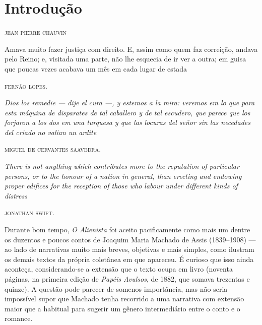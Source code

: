 \chapter[Introdução, \emph{por Jean Pierre Chauvin}]{Introdução}

\begin{flushright}
\textsc{jean pierre chauvin}
\end{flushright}

\epigraph{Amava muito fazer justiça com direito. E, assim como quem faz
correição, andava pelo Reino; e, visitada uma parte, não lhe esquecia de
ir ver a outra; em guisa que poucas vezes acabava um mês em cada lugar
de estada}{\textsc{fernão lopes}.\footnotemark}

\epigraph{\emph{Dios los remedie --- dije el cura ---, y estemos a la mira:
veremos em lo que para esta máquina de disparates de tal caballero y de
tal escudero, que parece que los forjaron a los dos em una turquesa y
que las locuras del señor sin las necedades del criado no valian un
ardite}}{\textsc{miguel de cervantes saavedra}.\footnotemark}

\epigraph{\emph{There is not anything which contributes more to the reputation
of particular persons, or to the honour of a nation in general, than
erecting and endowing proper edifices for the reception of those who
labour under different kinds of distress}}{\textsc{jonathan swift}.\footnotemark}

Durante bom tempo, \emph{O Alienista} foi aceito pacificamente como mais
um dentre os duzentos e poucos contos de Joaquim Maria Machado de Assis
(1839--1908) --- ao lado de narrativas muito mais breves, objetivas e mais
simples, como ilustram os demais textos da própria coletânea em que
apareceu. É curioso que isso ainda aconteça, considerando-se a extensão
que o texto ocupa em livro (noventa páginas, na primeira edição de
\emph{Papéis Avulsos}, de 1882, que somava trezentas e quinze). A
questão pode parecer de somenos importância, mas não seria impossível
supor que Machado tenha recorrido a uma narrativa com extensão maior que
a habitual para sugerir um gênero intermediário entre o conto e o
romance.


